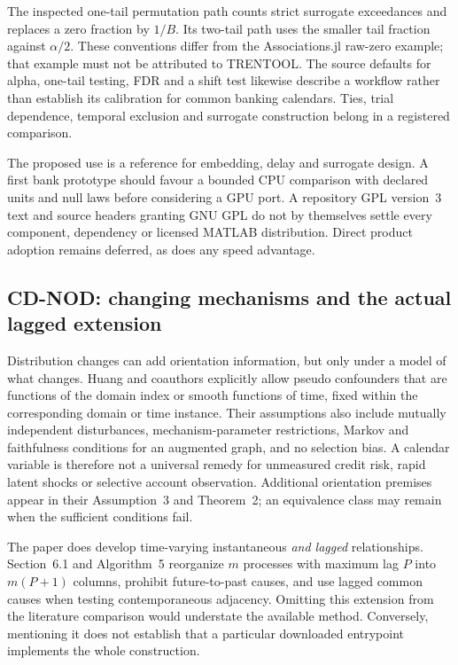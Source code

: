 The inspected one-tail permutation path counts strict surrogate exceedances
and replaces a zero fraction by $1/B$. Its two-tail path uses the smaller
tail fraction against $\alpha/2$. These conventions differ from the
Associations.jl raw-zero example; that example must not be attributed to
TRENTOOL. The source defaults for alpha, one-tail testing, FDR and a shift
test likewise describe a workflow rather than establish its calibration for
common banking calendars. Ties, trial dependence, temporal exclusion and
surrogate construction belong in a registered comparison.
\citep{exec17_temporal_trentool}

The proposed use is a reference for embedding, delay and surrogate design.
A first bank prototype should favour a bounded CPU comparison with declared
units and null laws before considering a GPU port. A repository GPL version~3
text and source headers granting GNU GPL do not by themselves settle every
component, dependency or licensed MATLAB distribution. Direct product adoption
remains deferred, as does any speed advantage.
\citep{exec17_temporal_trentool}

\subsection{CD-NOD: changing mechanisms and the actual lagged extension}

Distribution changes can add orientation information, but only under a model
of what changes. Huang and coauthors explicitly allow pseudo confounders that
are functions of the domain index or smooth functions of time, fixed within
the corresponding domain or time instance. Their assumptions also include
mutually independent disturbances, mechanism-parameter restrictions,
Markov and faithfulness conditions for an augmented graph, and no selection
bias. A calendar variable is therefore not a universal remedy for unmeasured
credit risk, rapid latent shocks or selective account observation.
Additional orientation premises appear in their Assumption~3 and Theorem~2;
an equivalence class may remain when the sufficient conditions fail.
\citep{exec17_temporal_cdnod_paper}

The paper does develop time-varying instantaneous \emph{and lagged}
relationships. Section~6.1 and Algorithm~5 reorganize $m$ processes with
maximum lag $P$ into $m(P+1)$ columns, prohibit future-to-past causes, and use
lagged common causes when testing contemporaneous adjacency. Omitting this
extension from the literature comparison would understate the available
method. Conversely, mentioning it does not establish that a particular
downloaded entrypoint implements the whole construction.
\citep{exec17_temporal_cdnod_paper}

